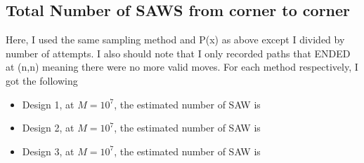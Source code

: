 \documentclass[12pt]{article}
\begin{document}
\subsection{Total Number of SAWS from corner to corner}
Here, I used the same sampling method and P(x) as above except I divided by number of attempts. I also should note that I only recorded paths that ENDED at (n,n) meaning there were no more valid moves. For each method respectively, I got the following
\begin{itemize}
  \item Design 1, at $M=10^7$, the estimated number of SAW is 
  \item Design 2, at $M=10^7$, the estimated number of SAW is 
  \item Design 3, at $M=10^7$, the estimated number of SAW is
\end{itemize} 
\end{document}
